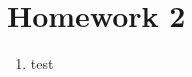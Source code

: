 \documentclass[a4paper,12pt]{article}
\begin{document}
\section*{Homework 2}

\begin{enumerate}

\item test

\end{enumerate}
\end{document}
